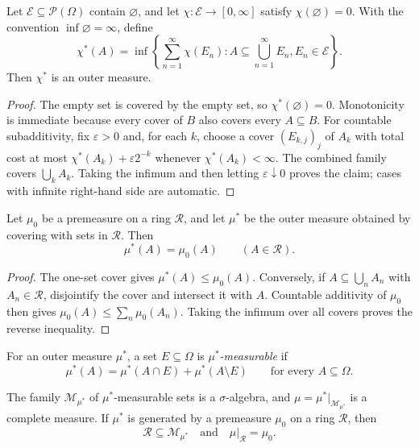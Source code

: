 \begin{thm}
Let $\mathcal E\subseteq\mathcal P(\Omega)$ contain $\varnothing$, and let
$\chi:\mathcal E\to[0,\infty]$ satisfy $\chi(\varnothing)=0$. With the
convention $\inf\varnothing=\infty$, define
\[
\chi^*(A)=
\inf\left\{\sum_{n=1}^{\infty}\chi(E_n):
 A\subseteq\bigcup_{n=1}^{\infty}E_n,
 E_n\in\mathcal E\right\}.
\]
Then $\chi^*$ is an outer measure.
\end{thm}

\begin{proof}
The empty set is covered by the empty set, so $\chi^*(\varnothing)=0$.
Monotonicity is immediate because every cover of $B$ also covers every
$A\subseteq B$. For countable subadditivity, fix $\varepsilon>0$ and, for
each $k$, choose a cover $(E_{k,j})_j$ of $A_k$ with total cost at most
$\chi^*(A_k)+\varepsilon2^{-k}$ whenever $\chi^*(A_k)<\infty$. The combined
family covers $\bigcup_kA_k$. Taking the infimum and then letting
$\varepsilon\downarrow0$ proves the claim; cases with infinite right-hand
side are automatic.
\end{proof}

\begin{thm}
Let $\mu_0$ be a premeasure on a ring $\mathcal R$, and let $\mu^*$ be
the outer measure obtained by covering with sets in $\mathcal R$. Then
\[
\mu^*(A)=\mu_0(A)\qquad(A\in\mathcal R).
\]
\end{thm}

\begin{proof}
The one-set cover gives $\mu^*(A)\leq\mu_0(A)$. Conversely, if
$A\subseteq\bigcup_nA_n$ with $A_n\in\mathcal R$, disjointify the cover and
intersect it with $A$. Countable additivity of $\mu_0$ then gives
$\mu_0(A)\leq\sum_n\mu_0(A_n)$. Taking the infimum over all covers proves the
reverse inequality.
\end{proof}

\begin{de}
For an outer measure $\mu^*$, a set $E\subseteq\Omega$ is
\emph{$\mu^*$-measurable} if
\[
\mu^*(A)=\mu^*(A\cap E)+\mu^*(A\setminus E)
\qquad\text{for every }A\subseteq\Omega.
\]
\end{de}

\begin{thm}
The family $\mathcal M_{\mu^*}$ of $\mu^*$-measurable sets is a
$\sigma$-algebra, and $\mu=\mu^*|_{\mathcal M_{\mu^*}}$ is a complete
measure. If $\mu^*$ is generated by a premeasure $\mu_0$ on a ring
$\mathcal R$, then
\[
\mathcal R\subseteq\mathcal M_{\mu^*}
\quad\text{and}\quad
\mu|_{\mathcal R}=\mu_0.
\]
\end{thm}

